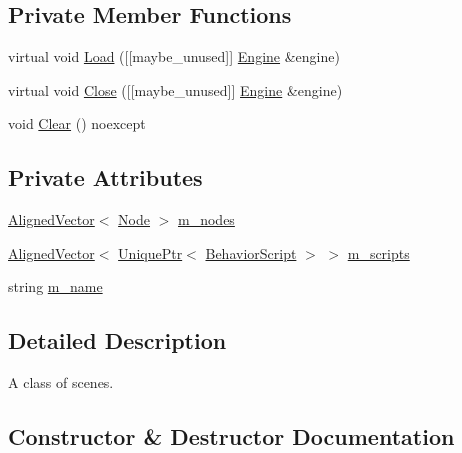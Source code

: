 \subsection*{Private Member Functions}
\begin{DoxyCompactItemize}
\item 
virtual void \hyperlink{classmage_1_1_scene_a02ec2f7b43fd7050bc41eb7d89d4baba}{Load} (\mbox{[}\mbox{[}maybe\+\_\+unused\mbox{]}\mbox{]} \hyperlink{classmage_1_1_engine}{Engine} \&engine)
\item 
virtual void \hyperlink{classmage_1_1_scene_a6b90bb51fb3b5e965a42bfa57f992803}{Close} (\mbox{[}\mbox{[}maybe\+\_\+unused\mbox{]}\mbox{]} \hyperlink{classmage_1_1_engine}{Engine} \&engine)
\item 
void \hyperlink{classmage_1_1_scene_adf4a5b3885e34336caa5f145f55e01e1}{Clear} () noexcept
\end{DoxyCompactItemize}
\subsection*{Private Attributes}
\begin{DoxyCompactItemize}
\item 
\hyperlink{namespacemage_a8664bfb5ce2179fc64eae9f82c8a5ba8}{Aligned\+Vector}$<$ \hyperlink{classmage_1_1_node}{Node} $>$ \hyperlink{classmage_1_1_scene_a270ac4a26210b95ba05957af19c4c43c}{m\+\_\+nodes}
\item 
\hyperlink{namespacemage_a8664bfb5ce2179fc64eae9f82c8a5ba8}{Aligned\+Vector}$<$ \hyperlink{namespacemage_a3316d7143a973e37adf1110f2e80ca31}{Unique\+Ptr}$<$ \hyperlink{classmage_1_1_behavior_script}{Behavior\+Script} $>$ $>$ \hyperlink{classmage_1_1_scene_ae57ca3aeb6b0d8b2cb8cf40334b883f8}{m\+\_\+scripts}
\item 
string \hyperlink{classmage_1_1_scene_a6cc8cb08b1853c4e3063b33a94e8fb47}{m\+\_\+name}
\end{DoxyCompactItemize}


\subsection{Detailed Description}
A class of scenes. 

\subsection{Constructor \& Destructor Documentation}
\hypertarget{classmage_1_1_scene_adc40910fdca62586659c2961fe7e7f3c}{}\label{classmage_1_1_scene_adc40910fdca62586659c2961fe7e7f3c} 
